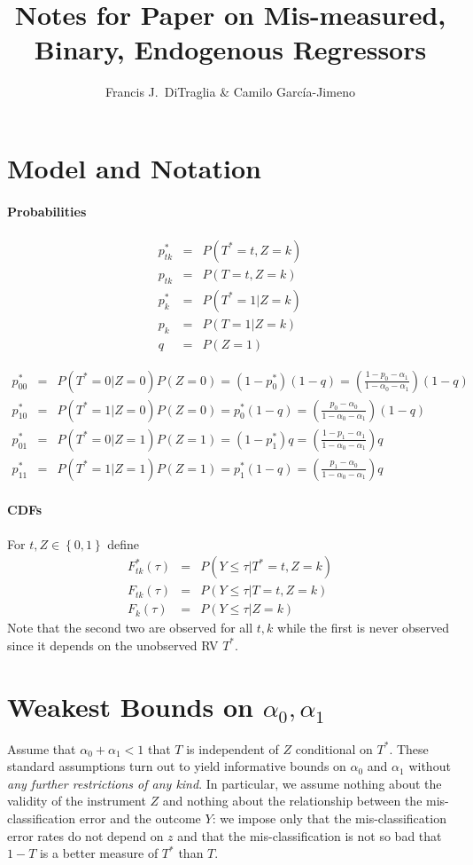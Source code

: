 \documentclass[12pt]{article}
\title{Notes for Paper on Mis-measured, Binary, Endogenous Regressors}
\author{Francis J.\ DiTraglia \& Camilo Garc\'{i}a-Jimeno}
\begin{document}
\maketitle

\section{Model and Notation}

\paragraph{Probabilities}
\begin{eqnarray*}
p^*_{tk} &=& P(T^*=t, Z=k)\\
p_{tk} &=& P(T=t, Z=k)\\
p^*_k &=& P(T^* = 1|Z = k)\\
p_k &=& P(T = 1|Z = k)\\
q &=& P(Z = 1)
\end{eqnarray*}

\begin{eqnarray*}
  p^*_{00} &=& P(T^* = 0|Z=0)P(Z=0) = (1 - p_0^*)(1 - q) =  \left( \frac{1 - p_0 - \alpha_1}{1 - \alpha_0 - \alpha_1} \right)(1 - q)\\
  p^*_{10} &=& P(T^* = 1|Z=0)P(Z=0) = p_0^*(1 - q) =  \left( \frac{p_0 - \alpha_0}{1 - \alpha_0 - \alpha_1} \right)(1 - q)\\
  p^*_{01} &=& P(T^* = 0|Z=1)P(Z=1) = (1 - p_1^*)q =  \left( \frac{1 - p_1 - \alpha_1}{1 - \alpha_0 - \alpha_1} \right) q\\
  p^*_{11} &=& P(T^* = 1|Z=1)P(Z=1) = p_1^*(1 - q)  =  \left( \frac{p_1 - \alpha_0}{1 - \alpha_0 - \alpha_1} \right)q
\end{eqnarray*}

\paragraph{CDFs}
For $t, Z \in \left\{ 0,1 \right\}$ define
\begin{eqnarray*}
F_{tk}^*(\tau) &=&  P(Y \leq \tau|T^* = t, Z = k) \\
F_{tk}(\tau) &=&  P(Y \leq \tau|T = t, Z = k)\\
F_k(\tau) &=& P(Y \leq \tau | Z=k) 
\end{eqnarray*}
Note that the second two are observed for all $t,k$ while the first is never observed since it depends on the unobserved RV $T^*$.


\section{Weakest Bounds on $\alpha_0, \alpha_1$}
Assume that $\alpha_0 + \alpha_1 < 1$ that $T$ is independent of $Z$ conditional on $T^*$.
These standard assumptions turn out to yield informative bounds on $\alpha_0$ and $\alpha_1$ without \emph{any further restrictions of any kind}.
In particular, we assume nothing about the validity of the instrument $Z$ and nothing about the relationship between the mis-classification error and the outcome $Y$: we impose only that the mis-classification error rates do not depend on $z$ and that the mis-classification is not so bad that $1 - T$ is a better measure of $T^*$ than $T$. 
\end{document}
